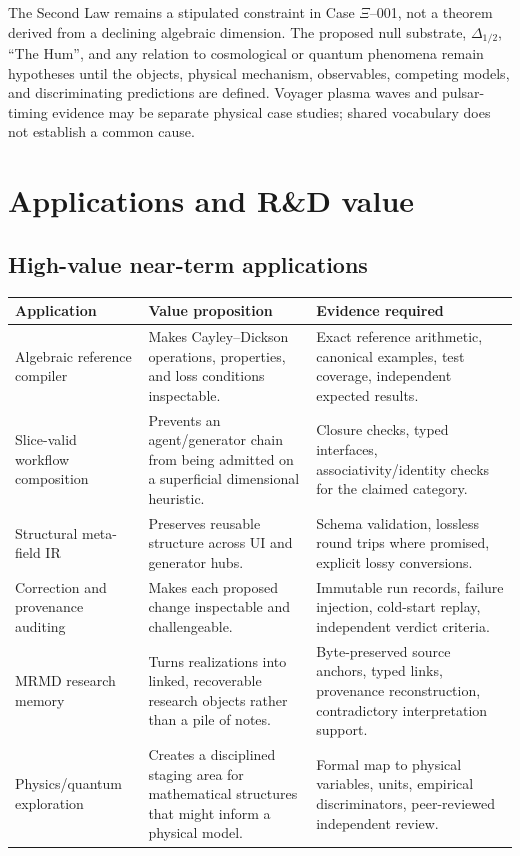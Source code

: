 \documentclass[11pt,oneside]{article}
\begin{document}
The Second Law remains a stipulated constraint in Case $\Xi$--001, not a theorem derived from a declining algebraic dimension. The proposed null substrate, $\Delta_{1/2}$, ``The Hum'', and any relation to cosmological or quantum phenomena remain hypotheses until the objects, physical mechanism, observables, competing models, and discriminating predictions are defined. Voyager plasma waves and pulsar-timing evidence may be separate physical case studies; shared vocabulary does not establish a common cause.

\section{Applications and R\&D value}
\subsection{High-value near-term applications}
\begin{longtable}{p{}p{}p{}}
\toprule
\textbf{Application} & \textbf{Value proposition} & \textbf{Evidence required} \\
\midrule
Algebraic reference compiler & Makes Cayley--Dickson operations, properties, and loss conditions inspectable. & Exact reference arithmetic, canonical examples, test coverage, independent expected results. \\
Slice-valid workflow composition & Prevents an agent/generator chain from being admitted on a superficial dimensional heuristic. & Closure checks, typed interfaces, associativity/identity checks for the claimed category. \\
Structural meta-field IR & Preserves reusable structure across UI and generator hubs. & Schema validation, lossless round trips where promised, explicit lossy conversions. \\
Correction and provenance auditing & Makes each proposed change inspectable and challengeable. & Immutable run records, failure injection, cold-start replay, independent verdict criteria. \\
MRMD research memory & Turns realizations into linked, recoverable research objects rather than a pile of notes. & Byte-preserved source anchors, typed links, provenance reconstruction, contradictory interpretation support. \\
Physics/quantum exploration & Creates a disciplined staging area for mathematical structures that might inform a physical model. & Formal map to physical variables, units, empirical discriminators, peer-reviewed independent review. \\
\bottomrule
\end{longtable}
\end{document}
